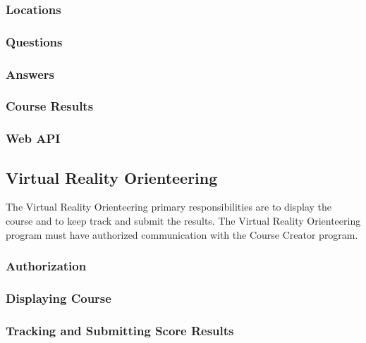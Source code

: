 \subsubsection{Locations}

\subsubsection{Questions}

\subsubsection{Answers}

\subsubsection{Course Results}

\subsubsection{Web API}

\subsection{Virtual Reality Orienteering}
The Virtual Reality Orienteering primary responsibilities are to display the course and to keep track and submit the results. The Virtual Reality Orienteering program must have authorized communication with the Course Creator program.

\subsubsection{Authorization}

\subsubsection{Displaying Course}

\subsubsection{Tracking and Submitting Score Results}

